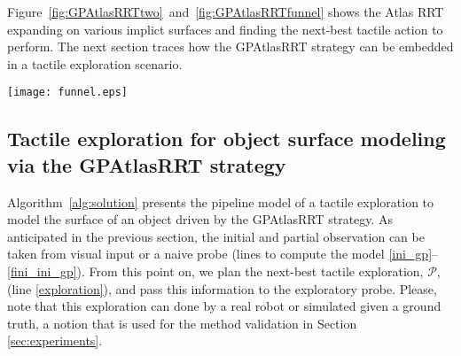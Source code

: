Figure~\ref{fig:GPAtlasRRTtwo}~and~\ref{fig:GPAtlasRRTfunnel} shows the Atlas RRT expanding on various implict surfaces and finding the next-best tactile action to perform.
The next section traces how the GPAtlasRRT strategy can be embedded in a tactile exploration scenario.

\begin{figure*}[hbt]
    \centering
    \texttt{[image: funnel.eps]}
    \caption{ A funnel (left-upper corner) is first seen by a depth camera. The segmented 3D points are shown in blue in the left figure to form the training set $\mathcal{S}^0$. The predicted shape by the GP on this set is shown in the middle obtained via a marching cube sampling algorithm. However, the GPAtlasRRT strategy does not require the explicit form of the predicted surface, as shown in the right figure. It works with the implicit form to devise the next-best tactile exploration shown in brighter green.}
    \label{fig:GPAtlasRRTfunnel}
\end{figure*}

\subsection{Tactile exploration for object surface modeling via the GPAtlasRRT strategy}
\label{sec:gpatlasrrt_tactile_exploration}

Algorithm~\ref{alg:solution} presents the pipeline model of a tactile exploration to model the surface of an object driven by the GPAtlasRRT strategy. As anticipated in the previous section, the initial and partial observation can be taken from visual input or a naive probe (lines to compute the model \ref{ini_gp}--\ref{fini_ini_gp}). From this point on, we plan the next-best tactile exploration, $\mathcal{P}$, (line \ref{exploration}), and pass this information to the exploratory probe. Please, note that this exploration can done by a real robot or simulated given a ground truth, a notion that is used for the method validation in Section \ref{sec:experiments}.

